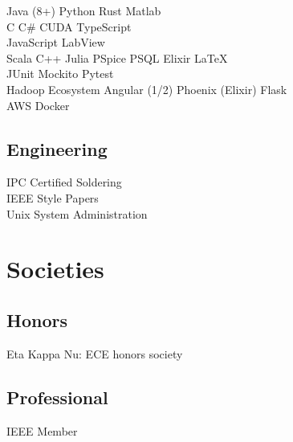 \documentclass[letterpaper]{deedy-resume-openfont} %
\begin{document}
\begin{minipage}[t]{0.33\textwidth}
 Java (8+) \textbullet{} Python \textbullet{} Rust  \textbullet{} Matlab  \\
C \textbullet{}  C\# \textbullet{} CUDA  \textbullet{} TypeScript \\
 JavaScript\textbullet{} LabView\\
Scala \textbullet{} C++ \textbullet{} Julia \textbullet{} PSpice  \textbullet{} PSQL \textbullet{} Elixir \textbullet{} \LaTeX \\
JUnit \textbullet{} Mockito \textbullet{} Pytest \\
Hadoop Ecosystem \textbullet{} Angular (1/2) \textbullet{} Phoenix (Elixir) \textbullet{} Flask\\
AWS\textbullet{} Docker


\sectionspace %

\subsection{Engineering}
IPC Certified Soldering \\
IEEE Style Papers \\
Unix System  Administration

\section{Societies} 
\subsection{Honors}
 Eta Kappa Nu: ECE honors society \\
\subsection{Professional}
IEEE Member 

\sectionspace %

\end{minipage} %
\hfill
%
\end{document}
